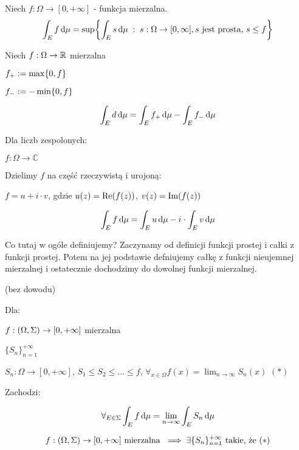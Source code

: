 \begin{definition}
    Niech \( f: \Omega\to [0, +\infty] \) - funkcja mierzalna.
    \[
        \int_E f \diff \mu = \sup \set{\int_E s \diff \mu \; : \; s: \Omega\to [0, \infty], s \text{ jest prosta, } s \leq f }
    \]
\end{definition}

\begin{definition}
    Niech  \( f: \Omega\to \mathbb{R} \) mierzalna

    \( f_+ := \max \set{0, f} \)

    \( f_- := -\min \set{0, f} \)

    \[
        \int_E d \mathop{}\!\mathrm{d} \mu = \int_E f_+ \mathop{}\!\mathrm{d} \mu - \int_E f_- \mathop{}\!\mathrm{d} \mu
    \]
\end{definition}

\begin{definition}
    Dla liczb zespolonych:

    \( f: \Omega\to \mathbb{C} \)

    Dzielimy \( f \) na część rzeczywistą i urojoną:

    \( f = u + i \cdot v \), gdzie \( u\pars{ z } = \text{Re}\pars{ f\pars{ z } } \), \( v\pars{ z } = \text{Im}\pars{ f\pars{ z } } \)

    \[
        \int_E f \mathop{}\!\mathrm{d} \mu = \int_E u \mathop{}\!\mathrm{d} \mu - i \cdot \int_E v \mathop{}\!\mathrm{d} \mu
    \]
\end{definition}

Co tutaj w ogóle definiujemy? Zaczynamy od definicji funkcji prostej i całki z funkcji prostej. Potem na jej podstawie defniujemy całkę z funkcji nieujemnej mierzalnej i ostatecznie dochodzimy do dowolnej funkcji mierzalnej.

\begin{theorem} (bez dowodu)

    Dla:

    \( f: \left( \Omega, \Sigma \right) \to [0, +\infty] \) mierzalna

    \( \{S_n\}_{n = 1}^{+\infty} \)

    \( S_n : \Omega \to [0, +\infty] \), \( S_1 \leq S_2 \leq \ldots \leq f \), \( \forall_{x \in \Omega} f(x) = \lim_{n \to \infty} S_n(x) \) \hfill \( (*) \)
    
    Zachodzi:

    \[
        \forall_{E \in \Sigma} \int_E f \mathop{}\!\mathrm{d} \mu = \lim_{n \to \infty} \int_E S_n \mathop{}\!\mathrm{d} \mu
    \]
\end{theorem}

\begin{theorem}
    \[
        f : \left( \Omega, \Sigma \right) \to [0, +\infty] \text{ mierzalna } \implies \exists \{S_n\}_{n = 1}^{+\infty} \text{ takie, że } (*)
    \]
\end{theorem}

